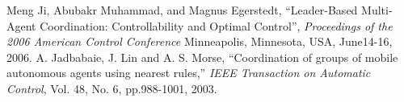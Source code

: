 \documentclass[letterpaper, 10 pt, conference]{ieeeconf}  %
\begin{document}
\addtolength{\textheight}{-12cm}   %

















\begin{thebibliography}{99}

 Meng Ji, Abubakr Muhammad, and Magnus Egerstedt, ``Leader-Based Multi-Agent Coordination: Controllability and Optimal Control'', \emph{Proceedings of the 2006 American Control Conference} Minneapolis, Minnesota, USA, June14-16, 2006.
 A.	Jadbabaie, J. Lin and A. S. Morse, ``Coordination of groups of mobile autonomous agents using nearest rules,'' \emph{IEEE Transaction on Automatic Control}, Vol. 48, No. 6, pp.988-1001, 2003.
 

\end{thebibliography}
\end{document}

